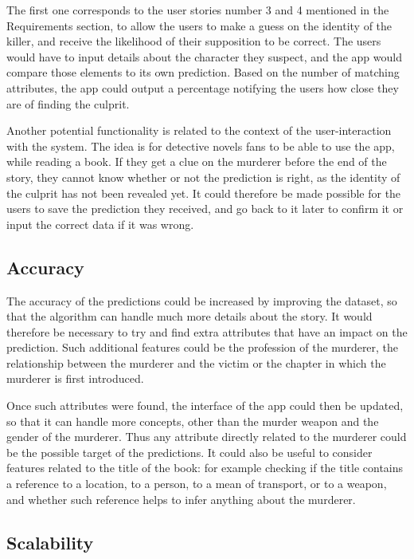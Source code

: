 \documentclass{mproj}
\begin{document}
The first one corresponds to the user stories number 3 and 4 mentioned in the Requirements section, to allow the users to make a guess on the identity of the killer, and receive the likelihood of their supposition to be correct. The users would have to input details about the character they suspect, and the app would compare those elements to its own prediction. Based on the number of matching attributes, the app could output a percentage notifying the users how close they are of finding the culprit. \par

Another potential functionality is related to the context of the user-interaction with the system. The idea is for detective novels fans to be able to use the app, while reading a book. If they get a clue on the murderer before the end of the story, they cannot know whether or not the prediction is right, as the identity of the culprit has not been revealed yet. It could therefore be made possible for the users to save the prediction they received, and go back to it later to confirm it or input the correct data if it was wrong.

\subsection*{Accuracy}

The accuracy of the predictions could be increased by improving the dataset, so that the algorithm can handle much more details about the story. It would therefore be necessary to try and find extra attributes that have an impact on the prediction. Such additional features could be the profession of the murderer, the relationship between the murderer and the victim or the chapter in which the murderer is first introduced. \par

Once such attributes were found, the interface of the app could then be updated, so that it can handle more concepts, other than the murder weapon and the gender of the murderer. Thus any attribute directly related to the murderer could be the possible target of the predictions.
It could also be useful to consider features related to the title of the book: for example checking if the title contains a reference to a location, to a person, to a mean of transport, or to a weapon, and whether such reference helps to infer anything about the murderer.
	
\subsection*{Scalability}
\end{document}
